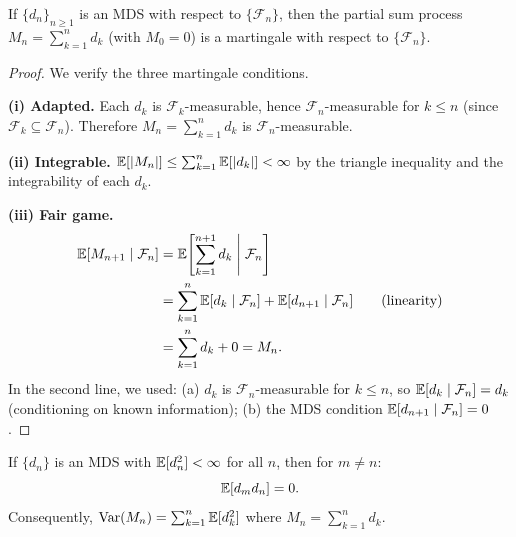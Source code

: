 \documentclass[11pt,a4paper]{article}
\begin{document}
\begin{keyresult}[title={MDS Partial Sums Form a Martingale}]
\begin{theorem}
\label{thm:mds_martingale}
If $\{d_n\}_{n \geq 1}$ is an MDS with respect to
$\{\mathcal{F}_n\}$, then the partial sum process
$M_n = \sum_{k=1}^n d_k$ (with $M_0 = 0$) is a martingale
with respect to $\{\mathcal{F}_n\}$.
\end{theorem}
\end{keyresult}

\begin{proof}
We verify the three martingale conditions.

\textbf{(i) Adapted.}
Each $d_k$ is $\mathcal{F}_k$-measurable, hence
$\mathcal{F}_n$-measurable for $k \leq n$ (since
$\mathcal{F}_k \subseteq \mathcal{F}_n$).  Therefore
$M_n = \sum_{k=1}^n d_k$ is $\mathcal{F}_n$-measurable.

\textbf{(ii) Integrable.}
$\mathbb{E}[|M_n|] \leq \sum_{k=1}^n \mathbb{E}[|d_k|] < \infty$ by the
triangle inequality and the integrability of each $d_k$.

\textbf{(iii) Fair game.}
\begin{align}
  \mathbb{E}[M_{n+1} \mid \mathcal{F}_n]
  &= \mathbb{E}\!\left[\sum_{k=1}^{n+1} d_k
    \;\middle|\; \mathcal{F}_n\right]
  \nonumber\\
  &= \sum_{k=1}^n \mathbb{E}[d_k \mid \mathcal{F}_n]
    + \mathbb{E}[d_{n+1} \mid \mathcal{F}_n]
  \tag{linearity}\\
  &= \sum_{k=1}^n d_k + 0
  = M_n.
  \label{eq:mds_mg_proof}
\end{align}
In the second line, we used:
(a) $d_k$ is $\mathcal{F}_n$-measurable for $k \leq n$, so
$\mathbb{E}[d_k \mid \mathcal{F}_n] = d_k$ (conditioning on known
information);
(b) the MDS condition
$\mathbb{E}[d_{n+1} \mid \mathcal{F}_n] = 0$.
\end{proof}

\begin{theorem}
\label{thm:mds_uncorrelated}
If $\{d_n\}$ is an MDS with $\mathbb{E}[d_n^2] < \infty$ for all $n$,
then for $m \neq n$:
\begin{equation}
  \mathbb{E}[d_m d_n] = 0.
  \label{eq:mds_uncorrelated}
\end{equation}
Consequently,
$\operatorname{Var}(M_n) = \sum_{k=1}^n \mathbb{E}[d_k^2]$ where
$M_n = \sum_{k=1}^n d_k$.
\end{theorem}
\end{document}
